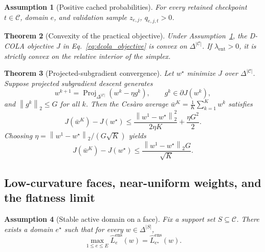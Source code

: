 \documentclass{article}
\newtheorem{theorem}{Theorem}[section]
\newtheorem{assumption}[theorem]{Assumption}
\theoremstyle{definition}
\newcommand{\cC}{\mathcal{C}}
\newcommand{\proj}{\operatorname{Proj}}
\newcommand{\dcola}{\textup{\textsc{D-COLA}}}
\newcommand{\simplex}{\Delta}
\newcommand{\norm}[1]{\left\lVert #1 \right\rVert}
\newcommand{\paren}[1]{\left( #1 \right)}
\begin{document}
\begin{assumption}[Positive cached probabilities]
\label{ass:positive_probs}
For every retained checkpoint \(t\in\cC\), domain \(e\), and validation sample \(z_{e,j}\), \(q_{e,j,t}>0\).
\end{assumption}

\begin{theorem}[Convexity of the practical objective]
\label{thm:convex}
Under Assumption~\ref{ass:positive_probs}, the \dcola{} objective \(J\) in Eq.~\eqref{eq:dcola_objective} is convex on \(\simplex^{|\cC|}\). If \(\lambda_{\mathrm{ent}}>0\), it is strictly convex on the relative interior of the simplex.
\end{theorem}

\begin{theorem}[Projected-subgradient convergence]
\label{thm:convergence}
Let \(w^\star\) minimize \(J\) over \(\simplex^{|\cC|}\). Suppose projected subgradient descent generates
\[
w^{k+1} = \proj_{\simplex^{|\cC|}}\paren{w^k-\eta g^k},
\qquad
g^k \in \partial J(w^k),
\]
and \(\norm{g^k}_2\le G\) for all \(k\). Then the Ces\`aro average \(\bar w^K=\frac{1}{K}\sum_{k=1}^{K}w^k\) satisfies
\begin{equation}
J(\bar w^K)-J(w^\star)
\le
\frac{\norm{w^1-w^\star}_2^2}{2\eta K}
+
\frac{\eta G^2}{2}.
\label{eq:convergence_rate}
\end{equation}
Choosing \(\eta=\norm{w^1-w^\star}_2/(G\sqrt{K})\) yields
\[
J(\bar w^K)-J(w^\star)\le \frac{\norm{w^1-w^\star}_2G}{\sqrt{K}}.
\]
\end{theorem}

\subsection{Low-curvature faces, near-uniform weights, and the flatness limit}

\begin{assumption}[Stable active domain on a face]
\label{ass:active_face}
Fix a support set \(S\subseteq \cC\). There exists a domain \(e^\star\) such that for every \(w\in \simplex^{|S|}\),
\[
\max_{1\le e\le E}\widehat L_e^{\mathrm{ens}}(w)=\widehat L_{e^\star}^{\mathrm{ens}}(w).
\]
\end{assumption}
\end{document}
